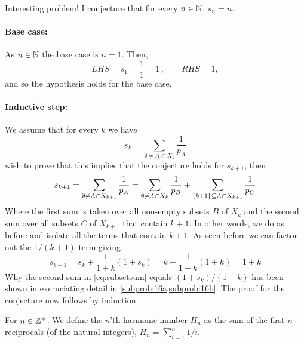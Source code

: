 \documentclass[a4paper, english, 12pt]{article} %
\newcommand{\solutions}{false} %
\begin{document}
\begin{answer}
  \noindent
  Interesting problem! I conjecture that for every $n \in \mathbb{N}$, $s_n = n$.
  \paragraph{Base case:} As $n \in \mathbb{N}$ the base case is $n = 1$. Then,
  \begin{equation*}
    LHS = s_1 = \frac{1}{1} = 1 \,, \qquad
    RHS = 1,
  \end{equation*}
  and so the hypothesis holds for the base case.
  
  \paragraph{Inductive step:} We assume that for every $k$ we have
  \begin{equation*}
    s_k = \sum_{\emptyset \neq A \subset X_k} \frac{1}{p_A} 
  \end{equation*}
  wish to prove that this implies that the conjecture holds for $s_{k+1}$, then
  \begin{equation}
    \label{eq:subsetsum}
    s_{k+1}
      = \sum_{\emptyset \neq A \subset X_{k+1}} \frac{1}{p_A}
      = \sum_{\emptyset \neq A \subset X_{k}} \frac{1}{p_B}
      + \sum_{\{k+1\} \subseteq A \subset X_{k+1}} \frac{1}{p_C}\\ 
  \end{equation}
  Where the first sum is taken over all non-empty subsets $B$ of $X_k$ and the
  second sum over all subsets $C$ of $X_{k+1}$ that contain $k+1$. In other
  words, we do as before and isolate all the terms that contain $k+1$. As seen
  before we can factor out the $1/(k+1)$ term giving
  \begin{equation*}
    s_{k+1}
    = s_k + \frac{1}{1+k} (1 + s_k) = k + \frac{1}{1+k}(1+k) = 1 + k
  \end{equation*}
  Why the second sum in \cref{eq:subsetsum} equals $(1+s_k)/(1+k)$ has been shown in excruciating
  detail in
  \cref{subprob:16a,subprob:16b}. The proof for the conjecture now follows by induction.
\end{answer}


\begin{problem}
  For $n \in \mathbb{Z}^+$. We define the $n$'th harmonic number $H_n$ as the sum
  of the first $n$ reciprocals (of the natural integers),  $H_n = \sum_{i=1}^n 1/i$.
\end{problem}
\end{document}
